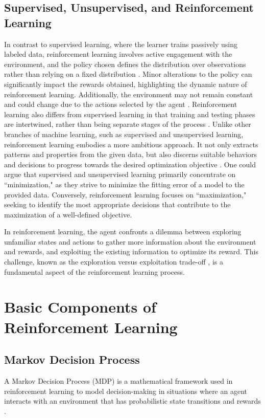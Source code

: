 \subsection{Supervised, Unsupervised, and Reinforcement Learning}
In contrast to supervised learning, where the learner trains passively using labeled data, reinforcement learning involves active engagement with the environment, and the policy chosen defines the distribution over observations rather than relying on a fixed distribution \cite{jordan2015}. Minor alterations to the policy can significantly impact the rewards obtained, highlighting the dynamic nature of reinforcement learning. Additionally, the environment may not remain constant and could change due to the actions selected by the agent \cite{buehler2019}. Reinforcement learning also differs from supervised learning in that training and testing phases are intertwined, rather than being separate stages of the process \cite{RL2}. 
Unlike other branches of machine learning, such as supervised and unsupervised learning, reinforcement learning embodies a more ambitious approach. It not only extracts patterns and properties from the given data, but also discerns suitable behaviors and decisions to progress towards the desired optimization objective \cite{RL}. One could argue that supervised and unsupervised learning primarily concentrate on ``minimization," as they strive to minimize the fitting error of a model to the provided data. Conversely, reinforcement learning focuses on ``maximization," seeking to identify the most appropriate decisions that contribute to the maximization of a well-defined objective.

In reinforcement learning, the agent confronts a dilemma between exploring unfamiliar states and actions to gather more information about the environment and rewards, and exploiting the existing information to optimize its reward. This challenge, known as the exploration versus exploitation trade-off \cite{RL2}, is a fundamental aspect of the reinforcement learning process.

\section{Basic Components of Reinforcement Learning}
\subsection{Markov Decision Process}
A Markov Decision Process (MDP) is a mathematical framework used in reinforcement learning to model decision-making in situations where an agent interacts with an environment that has probabilistic state transitions and rewards \cite{Markov}. 


